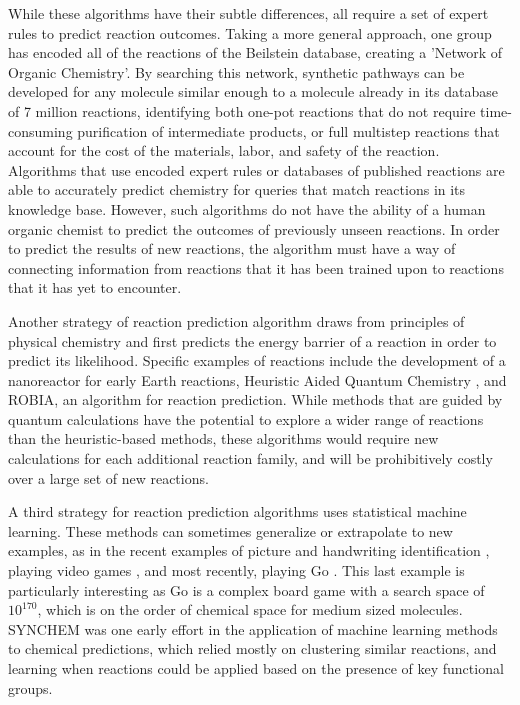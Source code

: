 While these algorithms have their subtle differences, all require a set of expert rules to predict reaction outcomes. Taking a more general approach, one group has encoded all of the reactions of the Beilstein database, creating a 'Network of Organic Chemistry'\cite{Gothard_2012,Szymkuc_2016}. By searching this network, synthetic pathways can be developed for any molecule similar enough to a molecule already in its database of 7 million reactions, identifying both one-pot reactions that do not require time-consuming purification of intermediate products\cite{Grzybowski_2009}, or full multistep reactions that account for the cost of the materials, labor, and safety of the reaction\cite{Szymkuc_2016}. Algorithms that use encoded expert rules or databases of published reactions are able to accurately predict chemistry for queries that match reactions in its knowledge base. However, such algorithms do not have the ability of a human organic chemist to predict the outcomes of previously unseen reactions. In order to predict the results of new reactions, the algorithm must have a way of connecting information from reactions that it has been trained upon to reactions that it has yet to encounter.

Another strategy of reaction prediction algorithm draws from principles of physical chemistry and first predicts the energy barrier of a reaction in order to predict its likelihood\cite{Zimmerman_2013,Wang_2014,Wang_2016,xu2009dynamics,Rappoport_2014,Socorro_2005}. Specific examples of reactions include the development of a nanoreactor for early Earth reactions\cite{Wang_2014,Wang_2016}, Heuristic Aided Quantum Chemistry \cite{Rappoport_2014}, and ROBIA\cite{Socorro_2005}, an algorithm for reaction prediction. While methods that are guided by quantum calculations have the potential to explore a wider range of reactions than the heuristic-based methods, these algorithms would require new calculations for each additional reaction family, and will be prohibitively costly over a large set of new reactions.

A third strategy for reaction prediction algorithms uses statistical machine learning. These methods can sometimes generalize or extrapolate to new examples, as in the recent examples of picture and handwriting identification \cite{He_2015,krizhevsky2012imagenet}, playing video games \cite{mnih2015human}, and most recently, playing Go \cite{silver2016mastering}. This last example is particularly interesting as Go is a complex board game with a search space of $10^{170}$, which is on the order of chemical space for medium sized molecules\cite{reymond2010chemical}.  SYNCHEM was one early effort in the application of machine learning methods to chemical predictions, which relied mostly on clustering similar reactions, and learning when reactions could be applied based on the presence of key functional groups\cite{Gelernter_1990}. 


